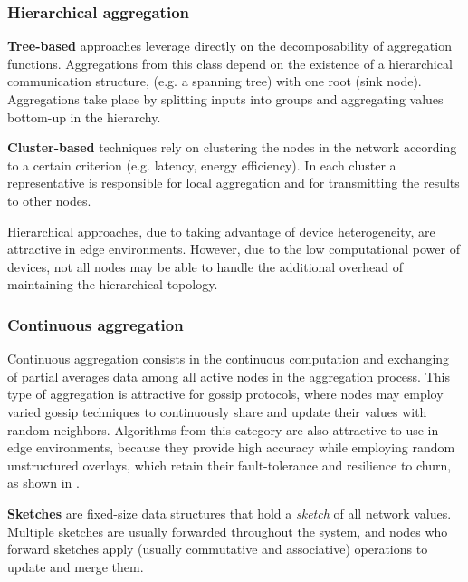 \subsubsection*{Hierarchical aggregation}

\textbf{Tree-based} approaches leverage directly on the decomposability of aggregation functions. Aggregations from this class depend on the existence of a hierarchical communication structure, (e.g. a spanning tree) with one root (sink node). Aggregations take place by splitting inputs into groups and aggregating values bottom-up in the hierarchy. 


\textbf{Cluster-based} techniques rely on clustering the nodes in the network according to a certain criterion (e.g. latency, energy efficiency). In each cluster a representative is responsible for local aggregation and for transmitting the results to other nodes. 

Hierarchical approaches, due to taking advantage of device heterogeneity, are attractive in edge environments. However, due to the low computational power of devices, not all nodes may be able to handle the additional overhead of maintaining the hierarchical topology.

\subsubsection*{Continuous aggregation}

Continuous aggregation consists in the continuous computation and exchanging of partial averages data among all active nodes in the aggregation process. This type of aggregation is attractive for gossip protocols, where nodes may employ varied gossip techniques to continuously share and update their values with random neighbors. Algorithms from this category are also attractive to use in edge environments, because they provide high accuracy while employing random unstructured overlays, which retain their fault-tolerance and resilience to churn, as shown in \cite{gossip_aggregation}.

\textbf{Sketches} are fixed-size data structures that hold a \textit{sketch} of all network values. Multiple sketches are usually forwarded throughout the system, and nodes who forward sketches apply (usually commutative and associative) operations to update and merge them.


